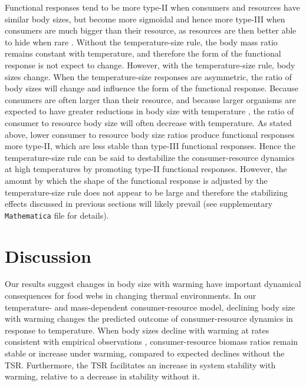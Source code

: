 \documentclass[11pt]{article}
\begin{document}
Functional responses tend to be more type-II when consumers and resources have similar body sizes, but become more sigmoidal and hence more type-III when consumers are much bigger than their resource, as resources are then better able to hide when rare \citep{Kalinkat2013}.
Without the temperature-size rule, the body mass ratio remains constant with temperature, and therefore the form of the functional response is not expect to change.
However, with the temperature-size rule, body sizes change.
When the temperature-size responses are asymmetric, the ratio of body sizes will change and influence the form of the functional response.
Because consumers are often larger than their resource, and because larger organisms are expected to have greater reductions in body size with temperature \citep{Forster2012}, the ratio of consumer to resource body size will often decrease with temperature.
As stated above, lower consumer to resource body size ratios produce functional responses more type-II, which are less stable than type-III functional responses.
Hence the temperature-size rule can be said to destabilize the consumer-resource dynamics at high temperatures by promoting type-II functional responses. %
However, the amount by which the shape of the functional response is adjusted by the temperature-size rule does not appear to be large and therefore the stabilizing effects discussed in previous sections will likely prevail (see supplementary \texttt{Mathematica} file for details). 

\section*{Discussion}

Our results suggest changes in body size with warming have important dynamical consequences for food webs in changing thermal environments. 
In our temperature- and mass-dependent consumer-resource model, declining body size with warming changes the predicted outcome of consumer-resource dynamics in response to temperature. 
When body sizes decline with warming at rates consistent with empirical observations \citep{Forster2012}, consumer-resource biomass ratios remain stable or increase under warming, compared to expected declines without the TSR. 
Furthermore, the TSR facilitates an increase in system stability with warming, relative to a decrease in stability without it. 
\end{document}
